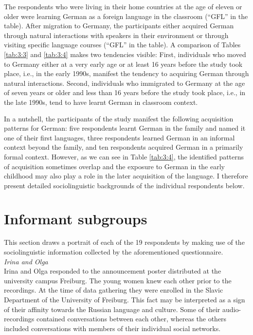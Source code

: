 The respondents who were living in their home countries at the age of eleven or older were learning German as a foreign language in the classroom (“GFL” in the table). After migration to Germany, the participants either acquired German through natural interactions with speakers in their environment or through visiting specific language courses (“GFL” in the table). A comparison of Tables \ref{tab:3:3} and \ref{tab:3:4} makes two tendencies visible: First, individuals who moved to Germany either at a very early age or at least 16 years before the study took place, i.e., in the early 1990s, manifest the tendency to acquiring German through natural interactions. Second, individuals who immigrated to Germany at the age of seven years or older and less than 16 years before the study took place, i.e., in the late 1990s, tend to have learnt German in classroom context.

In a nutshell, the participants of the study manifest the following acquisition patterns for German: five respondents learnt German in the family and named it one of their first languages, three respondents learned German in an informal context beyond the family, and ten respondents acquired German in a primarily formal context. However, as we can see in Table \ref{tab:3:4}, the identified patterns of acquisition sometimes overlap and the exposure to German in the early childhood may also play a role in the later acquisition of the language. I therefore present detailed sociolinguistic backgrounds of the individual respondents below.

\section{Informant subgroups}\label{subgroups}

This section draws a portrait of each of the 19 respondents by making use of the sociolinguistic information collected by the aforementioned questionnaire.\\

\noindent \textit{Irina and Olga}\\
Irina and Olga responded to the announcement poster distributed at the university campus Freiburg. The young women knew each other prior to the recordings. At the time of data gathering they were enrolled in the Slavic Department of the University of Freiburg. This fact may be interpreted as a sign of their affinity towards the Russian language and culture. Some of their audio-recordings contained conversations between each other, whereas the others included conversations with members of their individual social networks.

